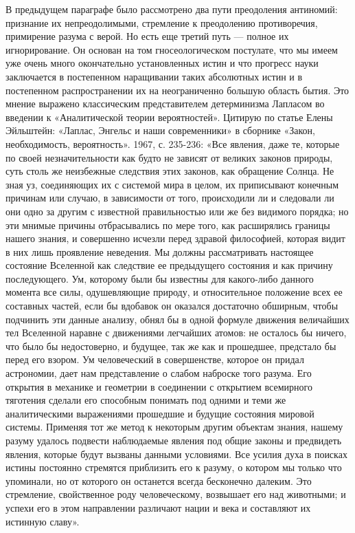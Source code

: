 В предыдущем параграфе было рассмотрено два пути преодоления антиномий:
признание их непреодолимыми, стремление к преодолению противоречия, примирение
разума с верой. Но есть еще третий путь --- полное их игнорирование. Он основан
на том гносеологическом постулате, что мы имеем уже очень много окончательно
установленных истин и что прогресс науки заключается в постепенном наращивании
таких абсолютных истин и в постепенном распространении их на неограниченно
большую область бытия. Это мнение выражено классическим представителем
детерминизма Лапласом во введении к «Аналитической теории вероятностей».
Цитирую по статье Елены Эйльштейн: «Лаплас, Энгельс и наши современники» в
сборнике «Закон, необходимость, вероятность». 1967, с. 235-236: «Все явления,
даже те, которые по своей незначительности как будто не зависят от великих
законов природы, суть столь же неизбежные следствия этих законов, как обращение
Солнца. Не зная уз, соединяющих их с системой мира в целом, их приписывают
конечным причинам или случаю, в зависимости от того, происходили ли и следовали
ли они одно за другим с известной правильностью или же без видимого порядка; но
эти мнимые причины отбрасывались по мере того, как расширялись границы нашего
знания, и совершенно исчезли перед здравой философией, которая видит в них лишь
проявление неведения. Мы должны рассматривать настоящее состояние Вселенной как
следствие ее предыдущего состояния и как причину последующего. Ум, которому
были бы известны для какого-либо данного момента все силы, одушевляющие
природу, и относительное положение всех ее составных частей, если бы вдобавок
он оказался достаточно обширным, чтобы подчинить эти данные анализу, обнял бы в
одной формуле движения величайших тел Вселенной наравне с движениями легчайших
атомов: не осталось бы ничего, что было бы недостоверно, и будущее, так же как
и прошедшее, предстало бы перед его взором. Ум человеческий в совершенстве,
которое он придал астрономии, дает нам представление о слабом наброске того
разума. Его открытия в механике и геометрии в соединении с открытием всемирного
тяготения сделали его способным понимать под одними и теми же аналитическими
выражениями прошедшие и будущие состояния мировой системы. Применяя тот же
метод к некоторым другим объектам знания, нашему разуму удалось подвести
наблюдаемые явления под общие законы и предвидеть явления, которые будут
вызваны данными условиями. Все усилия духа в поисках истины постоянно стремятся
приблизить его к разуму, о котором мы только что упоминали, но от которого он
останется всегда бесконечно далеким. Это стремление, свойственное роду
человеческому, возвышает его над животными; и успехи его в этом направлении
различают нации и века и составляют их истинную славу».

